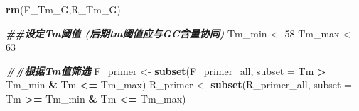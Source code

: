 \documentclass[
]{article}
\newenvironment{Shaded}{\begin{snugshade}}{\end{snugshade}}
\newcommand{\AttributeTok}[1]{\textcolor[rgb]{0.13,0.29,0.53}{#1}}
\newcommand{\DecValTok}[1]{\textcolor[rgb]{0.00,0.00,0.81}{#1}}
\newcommand{\DocumentationTok}[1]{\textcolor[rgb]{0.56,0.35,0.01}{\textbf{\textit{#1}}}}
\newcommand{\FunctionTok}[1]{\textcolor[rgb]{0.13,0.29,0.53}{\textbf{#1}}}
\newcommand{\NormalTok}[1]{#1}
\newcommand{\OtherTok}[1]{\textcolor[rgb]{0.56,0.35,0.01}{#1}}
\newcommand{\SpecialCharTok}[1]{\textcolor[rgb]{0.81,0.36,0.00}{\textbf{#1}}}
\begin{document}
\begin{Shaded}
\begin{Highlighting}[]
\FunctionTok{rm}\NormalTok{(F\_Tm\_G,R\_Tm\_G)}

\DocumentationTok{\#\#设定Tm阈值 (后期tm阈值应与GC含量协同)}
\NormalTok{Tm\_min }\OtherTok{\textless{}{-}} \DecValTok{58}
\NormalTok{Tm\_max }\OtherTok{\textless{}{-}} \DecValTok{63}

\DocumentationTok{\#\#根据Tm值筛选}
\NormalTok{F\_primer }\OtherTok{\textless{}{-}} \FunctionTok{subset}\NormalTok{(F\_primer\_all, }\AttributeTok{subset =}\NormalTok{ Tm }\SpecialCharTok{\textgreater{}=}\NormalTok{ Tm\_min }\SpecialCharTok{\&}\NormalTok{ Tm }\SpecialCharTok{\textless{}=}\NormalTok{ Tm\_max)}
\NormalTok{R\_primer }\OtherTok{\textless{}{-}} \FunctionTok{subset}\NormalTok{(R\_primer\_all, }\AttributeTok{subset =}\NormalTok{ Tm }\SpecialCharTok{\textgreater{}=}\NormalTok{ Tm\_min }\SpecialCharTok{\&}\NormalTok{ Tm }\SpecialCharTok{\textless{}=}\NormalTok{ Tm\_max)}
\end{Highlighting}
\end{Shaded}
\end{document}
